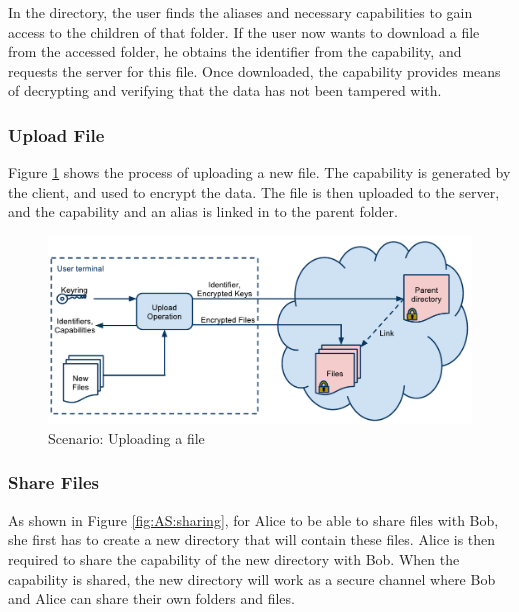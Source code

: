\documentclass[pdftex,english,10pt,b5paper,twoside]{book}
\begin{document}
In the directory, the user finds the aliases and necessary capabilities to gain
access to the children of that folder. If the user now wants to download a file
from the accessed folder, he obtains the identifier from the capability, and
requests the server for this file. Once downloaded, the capability provides
means of decrypting and verifying that the data has not been tampered with.

\subsubsection{Upload File}

Figure \ref{fig:AS:upload} shows the process of uploading a new file. The
capability is generated by the client, and used to encrypt the data. The file
is then uploaded to the server, and the capability and an alias is linked in to
the parent folder.

\begin{figure}[h!]
    \centering
    \includegraphics[width=\columnwidth]{ArchitectureUpload.pdf}
    \caption{Scenario: Uploading a file}
    \label{fig:AS:upload}
\end{figure}

\subsubsection{Share Files}

As shown in Figure \ref{fig:AS:sharing}, for Alice to be able to share files
with Bob, she first has to create a new directory that will contain these
files. Alice is then required to share the capability of the new directory with
Bob. When the capability is shared, the new directory will work as a secure
channel where Bob and Alice can share their own folders and files.
\end{document}
